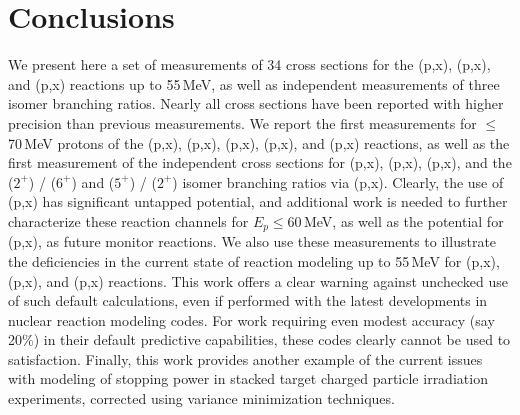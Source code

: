  
 \section{\label{sec:conclusions_fe}Conclusions}
 

We present here a set of measurements of 34 cross sections for the (p,x), (p,x), and  (p,x) reactions up to 55\,MeV, as well as  independent measurements of three isomer branching ratios.
Nearly all cross sections have been reported with higher precision than previous measurements.
We report the first measurements  for $\leq$70\,MeV protons  of the  (p,x), (p,x), (p,x),  (p,x), and (p,x) reactions, as well as the first measurement of the independent cross sections for    (p,x), (p,x), (p,x), and the  ($2^+$) /   ($6^+$) and  ($5^+$) /   ($2^+$)  isomer branching ratios via (p,x).
Clearly, the use of (p,x) has significant untapped potential, and additional work is needed to further characterize these reaction channels for $E_p \leq$60\,MeV, as well as the potential for (p,x), as future monitor reactions.
We also use these measurements to illustrate the deficiencies in the current state of  reaction modeling up to 55\,MeV for  (p,x), (p,x), and  (p,x) reactions.
This work offers a clear warning against unchecked use of  such default calculations, even if performed with the latest developments in nuclear reaction modeling codes. 
For work requiring even modest accuracy (say 20\%) in their default predictive capabilities, these codes clearly cannot be used to satisfaction.   
Finally, this work provides another example of the current issues with modeling of  stopping power in stacked target charged particle irradiation experiments, corrected using variance minimization techniques.  
% 
% 


